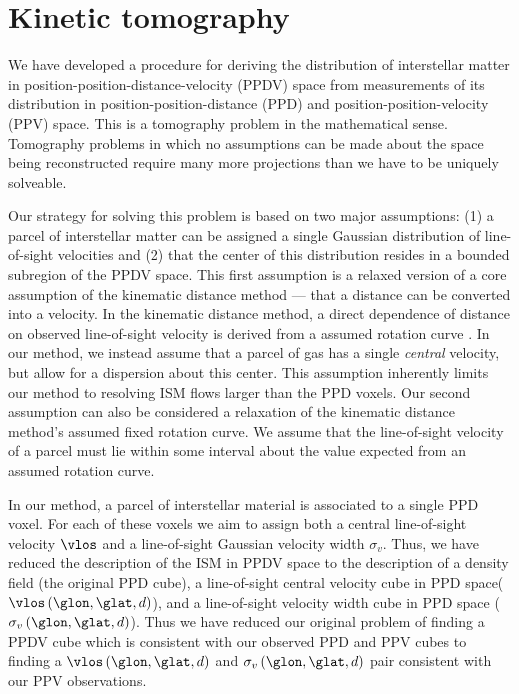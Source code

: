 \section{Kinetic tomography}
\label{sec:KT}

We have developed a procedure for deriving the distribution of interstellar matter in position-position-distance-velocity (PPDV) space from measurements of its distribution in position-position-distance (PPD) and position-position-velocity (PPV) space. This is a tomography problem in the mathematical sense. Tomography problems in which no assumptions can be made about the space being reconstructed require many more projections than we have to be uniquely solveable.

Our strategy for solving this problem is based on two major assumptions: (1) a parcel of interstellar matter can be assigned a single Gaussian distribution of line-of-sight velocities and (2) that the center of this distribution resides in a bounded subregion of the PPDV space. This first assumption is a relaxed version of a core assumption of the kinematic distance method --- that a distance can be converted into a velocity. In the kinematic distance method, a direct dependence of distance on observed line-of-sight velocity is derived from a assumed rotation curve \citep[e.g.][]{Levine_2006}. In our method, we instead assume that a parcel of gas has a single \emph{central} velocity, but allow for a dispersion about this center. This assumption inherently limits our method to resolving ISM flows larger than the PPD voxels. Our second assumption can also be considered a relaxation of the kinematic distance method's assumed fixed rotation curve. We assume that the line-of-sight velocity of a parcel must lie within some interval about the value expected from an assumed rotation curve. 

In our method, a parcel of interstellar material is associated to a single PPD voxel. For each of these voxels we aim to assign both a central line-of-sight velocity $\vlos$ and a line-of-sight Gaussian velocity width $\sigma_v$. Thus, we have reduced the description of the ISM in PPDV space to the description of a density field (the original PPD cube), a line-of-sight central velocity cube in PPD space($\vlos\left(\glon, \glat, d \right)$), and a line-of-sight velocity width cube in PPD space ($\sigma_v \left(\glon, \glat, d \right)$). Thus we have reduced our original problem of finding a PPDV cube which is consistent with our observed PPD and PPV cubes to finding a $\vlos\left(\glon, \glat, d \right)$ and $\sigma_v \left(\glon, \glat, d \right)$ pair consistent with our PPV observations. 








